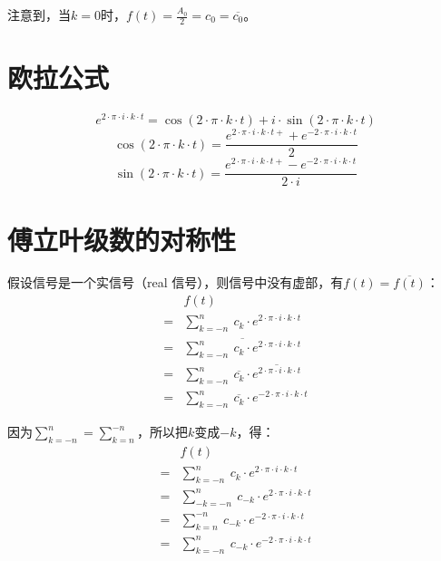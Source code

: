 注意到，当$k=0$时，$f(t)=\frac{A_0}{2}=c_0=\overline{c_0}$。
\section{欧拉公式}
\begin{equation}
	e^{2\cdot \pi\cdot i\cdot k\cdot t} =  \cos(2\cdot \pi\cdot k\cdot t)+i\cdot \sin(2\cdot \pi\cdot k\cdot t)
\end{equation}
\begin{equation}
	\cos(2\cdot \pi\cdot k\cdot t)=\frac{e^{2\cdot \pi\cdot i\cdot k\cdot t+}+e^{-2\cdot \pi\cdot i\cdot k\cdot t}}{2}
\end{equation}
\begin{equation}
	\sin(2\cdot \pi\cdot k\cdot t)=\frac{e^{2\cdot \pi\cdot i\cdot k\cdot t+}-e^{-2\cdot \pi\cdot i\cdot k\cdot t}}{2\cdot i}
\end{equation}
\section{傅立叶级数的对称性}

假设​信号是一个实信号（real 信号），则信号中没有虚部，有​$f(t)=\overline {f(t)}$：
\begin{align*}
	  & f(t)                                                                                        \\
	= & \sum\limits_{k=-n}^n\ c_k\cdot e^{2\cdot \pi \cdot i \cdot k \cdot t}                       \\
	= & \overline{\sum\limits_{k=-n}^n\ c_k\cdot e^{2\cdot \pi \cdot i \cdot k \cdot t}}            \\
	= & \sum\limits_{k=-n}^n\ \overline{c_k}\cdot \overline{e^{2\cdot \pi \cdot i \cdot k \cdot t}} \\
	= & \sum\limits_{k=-n}^n\ \overline{c_k}\cdot e^{-2\cdot \pi \cdot i \cdot k \cdot t}
\end{align*}

因为$\sum\limits_{k=-n}^n=\sum\limits_{k=n}^{-n}$，所以把$k$变成$-k$，得：
\begin{align*}
	  & f(t)                                                                        \\
	= & \sum\limits_{k=-n}^n\ c_k\cdot e^{2\cdot \pi \cdot i \cdot k \cdot t}       \\
	= & \sum\limits_{-k=-n}^n\ c_{-k}\cdot e^{2\cdot \pi \cdot i \cdot k \cdot t}   \\
	= & \sum\limits_{k=n}^{-n}\ c_{-k}\cdot e^{-2\cdot \pi \cdot i \cdot k \cdot t} \\
	= & \sum\limits_{k=-n}^n\ c_{-k}\cdot e^{-2\cdot \pi \cdot i \cdot k \cdot t}
\end{align*}


